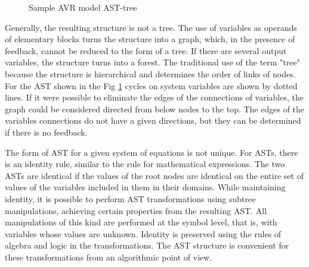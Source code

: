 \documentclass[lettersize,journal]{IEEEtran}
\begin{document}
\begin{figure}[h]
	\centering
	\caption{Sample AVR model AST-tree }
	\label{fig_ast}
\end{figure}

Generally, the resulting structure is not a tree. The use of variables as operands of elementary blocks turns the structure into a graph,
which, in the presence of feedback, cannot be reduced to the form of a tree. If there are several output variables, the structure
turns into a forest. The traditional use of the term "tree" because the structure is hierarchical and determines
the order of links of nodes. For the AST shown in the Fig \ref{fig_ast} cycles on system variables are shown by dotted lines. 
If it were possible to eliminate the edges of the connections of variables, the graph could be considered directed from below
nodes to the top. The edges of the variables connections do not have a given directions, but they can be determined 
if there is no feedback.


The form of AST for a given system of equations is not unique. For ASTs, there is an identity rule, similar to the rule for
mathematical expressions. The two ASTs are identical if the values of the root nodes are identical on the entire set of values of the
variables included in them in their domains. While maintaining identity, it is possible to perform AST 
transformations using subtree manipulations, achieving certain properties from the resulting AST. All manipulations of 
this kind are performed at the symbol level, that is, with variables whose values are unknown. Identity is preserved 
using the rules of algebra and logic in the transformations. The AST structure is convenient for these 
transformations from an algorithmic point of view.
\end{document}
